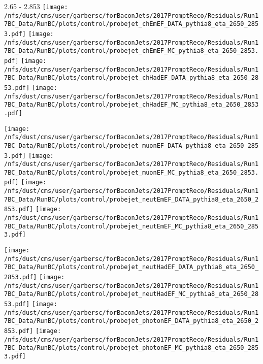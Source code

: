 \documentclass[t,compress]{beamer}
\begin{document}
\begin{frame}{2.65 - 2.853}
	\texttt{[image: /nfs/dust/cms/user/garbersc/forBaconJets/2017PromptReco/Residuals/Run17BC\_Data/RunBC/plots/control/probejet\_chEmEF\_DATA\_pythia8\_eta\_2650\_2853.pdf]}
	\texttt{[image: /nfs/dust/cms/user/garbersc/forBaconJets/2017PromptReco/Residuals/Run17BC\_Data/RunBC/plots/control/probejet\_chEmEF\_MC\_pythia8\_eta\_2650\_2853.pdf]}
	\texttt{[image: /nfs/dust/cms/user/garbersc/forBaconJets/2017PromptReco/Residuals/Run17BC\_Data/RunBC/plots/control/probejet\_chHadEF\_DATA\_pythia8\_eta\_2650\_2853.pdf]}
	\texttt{[image: /nfs/dust/cms/user/garbersc/forBaconJets/2017PromptReco/Residuals/Run17BC\_Data/RunBC/plots/control/probejet\_chHadEF\_MC\_pythia8\_eta\_2650\_2853.pdf]}
\newline

\vspace{-0.65cm}
	\texttt{[image: /nfs/dust/cms/user/garbersc/forBaconJets/2017PromptReco/Residuals/Run17BC\_Data/RunBC/plots/control/probejet\_muonEF\_DATA\_pythia8\_eta\_2650\_2853.pdf]}
	\texttt{[image: /nfs/dust/cms/user/garbersc/forBaconJets/2017PromptReco/Residuals/Run17BC\_Data/RunBC/plots/control/probejet\_muonEF\_MC\_pythia8\_eta\_2650\_2853.pdf]}
	\texttt{[image: /nfs/dust/cms/user/garbersc/forBaconJets/2017PromptReco/Residuals/Run17BC\_Data/RunBC/plots/control/probejet\_neutEmEF\_DATA\_pythia8\_eta\_2650\_2853.pdf]}
	\texttt{[image: /nfs/dust/cms/user/garbersc/forBaconJets/2017PromptReco/Residuals/Run17BC\_Data/RunBC/plots/control/probejet\_neutEmEF\_MC\_pythia8\_eta\_2650\_2853.pdf]}
\newline

\vspace{-0.65cm}
	\texttt{[image: /nfs/dust/cms/user/garbersc/forBaconJets/2017PromptReco/Residuals/Run17BC\_Data/RunBC/plots/control/probejet\_neutHadEF\_DATA\_pythia8\_eta\_2650\_2853.pdf]}
	\texttt{[image: /nfs/dust/cms/user/garbersc/forBaconJets/2017PromptReco/Residuals/Run17BC\_Data/RunBC/plots/control/probejet\_neutHadEF\_MC\_pythia8\_eta\_2650\_2853.pdf]}
	\texttt{[image: /nfs/dust/cms/user/garbersc/forBaconJets/2017PromptReco/Residuals/Run17BC\_Data/RunBC/plots/control/probejet\_photonEF\_DATA\_pythia8\_eta\_2650\_2853.pdf]}
	\texttt{[image: /nfs/dust/cms/user/garbersc/forBaconJets/2017PromptReco/Residuals/Run17BC\_Data/RunBC/plots/control/probejet\_photonEF\_MC\_pythia8\_eta\_2650\_2853.pdf]}
\end{frame}
\end{document}
